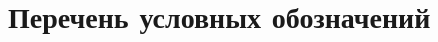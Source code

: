 \documentclass[a4paper,14pt]{extreport}
\begin{document}
\maketitle

{
  \renewcommand{\contentsname}{Оглавление}
  \tableofcontents
}

\chapter*{Перечень условных обозначений}











\end{document}
